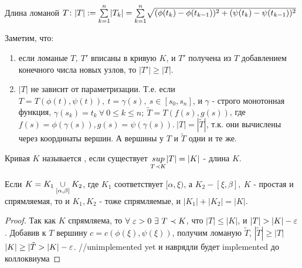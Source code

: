 \begin{opred}
Длина ломаной $T\colon|T|:=\underset{k=1}{\overset{n}{\sum}}|T_k|=\underset{k=1}{\overset{n}{\sum}}\sqrt{(\phi(t_k)-\phi(t_{k-1}))^2+(\psi(t_k)-\psi(t_{k-1}))^2}$
\end{opred}
\begin{remark}
Заметим, что:
\begin{enumerate}
\item если ломаные $T,\ T'$ вписаны в кривую $K$, и $T'$ получена из $T$ добавлением конечного числа новых узлов, то $|T'|\geq|T|$.
\item $|T|$ не зависит от параметризации. Т.е. если $T=T(\phi(t),\psi(t)),\ t=\gamma(s),\ s\in[s_0,s_n]$, и $\gamma$ - строго монотонная функция, $\gamma(s_k)=t_k\ \forall\ 0\leq k\leq n;\ \tilde{T}=T(f(s),g(s))$, где $f(s)=\phi(\gamma(s)), g(s)=\psi(\gamma(s)).\ |T|=|\tilde{T}|$, т.к. они вычислены через координаты вершин. А вершины у $T$ и $\tilde{T}$ одни и те же.
\end{enumerate}
\end{remark}
\begin{opred}
Кривая $K$ называется , если существует $\underset{T\prec K}{\overset{}{sup}}|T|=|K|$ - длина $K$.
\end{opred}
\begin{lemma}
Если $K=K_1\underset{[\alpha,\beta]}{\overset{}{\cup}} K_2$, где $K_1$ соответствует $[\alpha,\xi)$, а $K_2-[\xi,\beta],\ K$ - простая и спрямляемая, то и $K_1,K_2$ - тоже спрямляемые, и $|K_1|+|K_2|=|K|$.
\end{lemma}
\begin{proof}
Так как $K$ спрямляема, то $\forall\ \eps>0\ \exists\ T\prec K$, что $|T|\leq|K|$, и $|T|>|K|-\eps$. Добавив к $T$ вершину $c=c(\phi(\xi),\psi(\xi))$, получим ломаную $\tilde{T}$, $|\tilde{T}|\geq|T|$ \then $|K|\geq|\tilde{T}>|K|-\varepsilon$. //unimplemented yet и наврядли будет implemented до коллоквиума
\end{proof}
